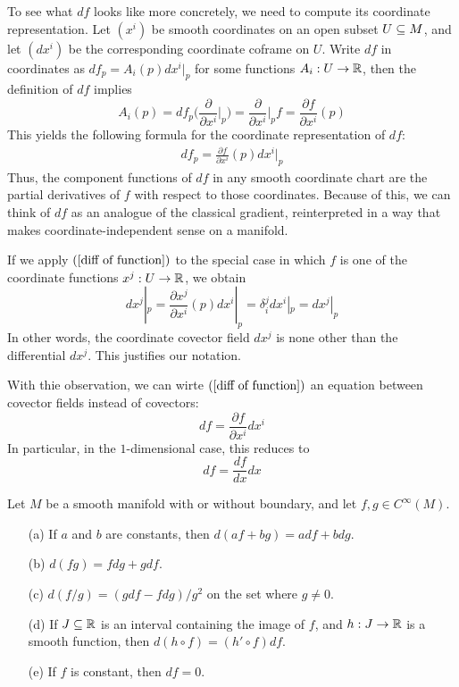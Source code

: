 To see what $df$ looks like more concretely, we need to compute its coordinate
representation. Let $(x^i)$ be smooth coordinates on an open subset $U\subseteq M$, and let $(dx^i)$ be the corresponding coordinate coframe on $U$. Write $df$ in coordinates as $df_p=A_i(p)dx^i|_p$ for some functions $A_i:U\to\mathbb{R}$, then the definition of $df$ implies
\[A_i(p)=df_p\Big(\frac{\partial}{\partial x^i}\Big|_p\Big)=\frac{\partial}{\partial x^i}\Big|_pf=\frac{\partial f}{\partial x^i}(p)\]
This yields the following formula for the coordinate representation of $df$:
\begin{align}\label{diff of function}
df_p=\frac{\partial f}{\partial x^i}(p)dx^i|_p
\end{align}
Thus, the component functions of $df$ in any smooth coordinate chart are the partial derivatives of $f$ with respect to those coordinates. Because of this, we can think of $df$ as an analogue of the classical gradient, reinterpreted in a way that makes coordinate-independent sense on a manifold.\par
If we apply $(\ref{diff of function})$ to the special case in which $f$ is one of the coordinate functions $x^j:U\to\mathbb{R}$, we obtain
\[dx^j|_p=\frac{\partial x^j}{\partial x^i}(p)dx^i|_p=\delta^j_idx^i|_p=dx^j|_p\]
In other words, the coordinate covector field $dx^j$ is none other than the differential $dx^j$. This justifies our notation.\par
With thie observation, we can wirte $(\ref{diff of function})$ an equation between covector fields instead of covectors:
\[df=\frac{\partial f}{\partial x^i}dx^i\]
In particular, in the $1$-dimensional case, this reduces to
\[df=\frac{df}{dx}dx\]
\begin{proposition}\label{diff function prop}
Let $M$ be a smooth manifold with or without boundary, and let $f,g\in C^\infty(M)$.
\begin{itemize}
\item[(a)] If $a$ and $b$ are constants, then $d(af+bg)=adf+bdg$.
\item[(b)] $d(fg)=fdg+gdf$.
\item[(c)] $d(f/g)=(gdf-fdg)/g^2$ on the set where $g\neq 0$.
\item[(d)] If $J\subseteq\mathbb{R}$ is an interval containing the image of $f$, and $h:J\to\mathbb{R}$ is a smooth function, then $d(h\circ f)=(h'\circ f)df$.
\item[(e)] If $f$ is constant, then $df=0$.
\end{itemize}
\end{proposition}
